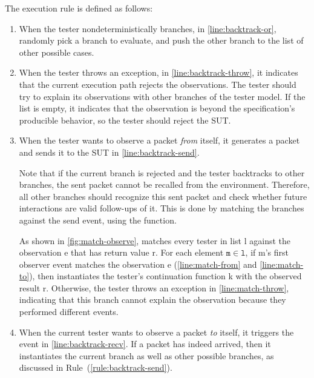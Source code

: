 The execution rule is defined as follows:
\begin{enumerate}
\item When the tester nondeterministically branches, in
\autoref{line:backtrack-or}, randomly pick a branch  to evaluate, and
push the other branch  to the list of other possible cases.

\item When the  tester throws an exception, in
\autoref{line:backtrack-throw}, it indicates that the current execution path
rejects the observations.  The tester should try to explain its observations
with other branches of the tester model.  If the  list is empty, it
indicates that the observation is beyond the specification's producible
behavior, so the tester should reject the SUT.

\item When the tester wants to observe a packet {\em from} itself, it generates
a packet and sends it to the SUT in \autoref{line:backtrack-send}.

Note that if the current branch is rejected and the tester backtracks to other
branches, the sent packet cannot be recalled from the environment.  Therefore,
all other branches should recognize this sent packet and check whether future
interactions are valid follow-ups of it.  This is done by matching the branches
against the send event, using the  function.

  As shown in \autoref{fig:match-observe},  matches every
  tester in list \ilc l against the observation \ilc e that has return
  value \ilc r.  For each element $\texttt m\in\texttt l$, if \ilc m's first
  observer event  matches the observation \ilc e
  (\autoref{line:match-from} and \autoref{line:match-to}),
  then  instantiates the tester's continuation function \ilc
  k with the observed result \ilc r.  Otherwise, the tester throws an exception
  in \autoref{line:match-throw}, indicating that this branch cannot explain the
  observation because they performed different events.
  \label{rule:backtrack-send}

\item When the current tester wants to observe a packet {\em to} itself, it
  triggers the  event in \autoref{line:backtrack-recv}.  If a
  packet has indeed arrived, then it instantiates the current branch as well as
  other possible branches, as discussed in Rule~(\ref{rule:backtrack-send}).


\end{enumerate}
